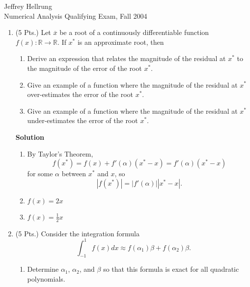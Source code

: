 \documentclass{article}
\begin{document}
\begin{flushright}
Jeffrey Hellrung \\
Numerical Analysis Qualifying Exam, Fall 2004 \\
\end{flushright}


\begin{enumerate}

\item (5 Pts.) Let \(\overline{x}\) be a root of a continuously differentiable function \(f(x) : \mathbb{R} \to \mathbb{R}\).  If \(x^*\) is an approximate root, then

\begin{enumerate}
\item Derive an expression that relates the magnitude of the residual at \(x^*\) to the magnitude of the error of the root \(x^*\).

\item Give an example of a function where the magnitude of the residual at \(x^*\) over-estimates the error of the root \(x^*\).

\item Give an example of a function where the magnitude of the residual at \(x^*\) under-estimates the error of the root \(x^*\).

\end{enumerate}

{\bf Solution}

\begin{enumerate}

\item By Taylor's Theorem,
\[f(x^*) = f(x) + f'(\alpha) (x^* - x)
         = f'(\alpha) (x^* - x)\]
for some \(\alpha\) between \(x^*\) and \(x\), so
\[|f(x^*)| = |f'(\alpha)| |x^* - x|.\]

\item \(f(x) = 2x\)

\item \(f(x) = \frac{1}{2} x\)

\end{enumerate}



\item (5 Pts.) Consider the integration formula
\[\int_{-1}^1 f(x) dx \approx f(\alpha_1) \beta + f(\alpha_2) \beta.\]

\begin{enumerate}
\item Determine \(\alpha_1\), \(\alpha_2\), and \(\beta\) so that this formula is exact for all quadratic polynomials.


\end{enumerate}
\end{enumerate}
\end{document}
